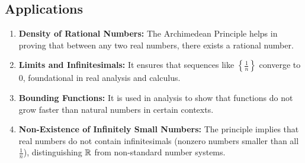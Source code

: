 \subsection{Applications}

\begin{enumerate}
	\item \textbf{Density of Rational Numbers:} The Archimedean Principle helps in proving that between any two real numbers, there exists a rational number.

	\item \textbf{Limits and Infinitesimals:} It ensures that sequences like \( \left\{ \frac{1}{n} \right\} \) converge to 0, foundational in real analysis and calculus.

	\item \textbf{Bounding Functions:} It is used in analysis to show that functions do not grow faster than natural numbers in certain contexts.

	\item \textbf{Non-Existence of Infinitely Small Numbers:} The principle implies that real numbers do not contain infinitesimals 
	(nonzero numbers smaller than all \( \frac{1}{n} \)), distinguishing \( \mathbb{R} \) from non-standard number systems.
\end{enumerate}

